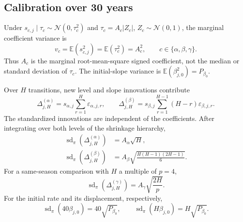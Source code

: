 \documentclass[11pt,a4paper]{article}
\newcommand{\E}{\mathbb E}
\newcommand{\N}{\mathcal N}
\begin{document}
	\subsection{Calibration over 30 years}
\label{subsec:thirty-year-effects}

Under \(s_{c,j}\mid\tau_c\sim\N(0,\tau_c^2)\) and
\(\tau_c=A_c|Z_c|\), \(Z_c\sim\N(0,1)\), the marginal coefficient
variance is
\begin{equation}\label{eq:supp-marginal-coefficient-variance}
v_c=\E(s_{c,j}^2)=\E(\tau_c^2)=A_c^2,
\qquad c\in\{\alpha,\beta,\gamma\}.
\end{equation}
Thus \(A_c\) is the marginal root-mean-square signed coefficient, not
the median or standard deviation of \(\tau_c\). The initial-slope
variance is \(\E(\beta_{j,0}^2)=P_{\beta_0}\).

Over \(H\) transitions, new level and slope innovations contribute
\[
\Delta^{(\alpha)}_{j,H}
=s_{\alpha,j}\sum_{r=1}^{H}\varepsilon_{\alpha,j,r},
\qquad
\Delta^{(\beta)}_{j,H}
=s_{\beta,j}\sum_{r=1}^{H-1}(H-r)\varepsilon_{\beta,j,r}.
\]
The standardized innovations are independent of the coefficients. After
integrating over both levels of the shrinkage hierarchy,
\begin{equation}\label{eq:supp-location-effect-scales}
\begin{aligned}
\operatorname{sd}_{\pi}(\Delta^{(\alpha)}_{j,H})
 &=A_\alpha\sqrt H,\\
\operatorname{sd}_{\pi}(\Delta^{(\beta)}_{j,H})
 &=A_\beta\sqrt{\frac{H(H-1)(2H-1)}{6}}.
\end{aligned}
\end{equation}
For a same-season comparison with \(H\) a multiple of \(p=4\),
\begin{equation}\label{eq:supp-seasonal-effect-scale}
\operatorname{sd}_{\pi}(\Delta^{(\gamma)}_{j,H})
=A_\gamma\sqrt{\frac{2H}{p}}.
\end{equation}
For the initial rate and its displacement, respectively,
\begin{equation}\label{eq:supp-initial-rate-scale}
\operatorname{sd}_{\pi}(40\beta_{j,0})=40\sqrt{P_{\beta_0}},
\qquad
\operatorname{sd}_{\pi}(H\beta_{j,0})=H\sqrt{P_{\beta_0}}.
\end{equation}
\end{document}
